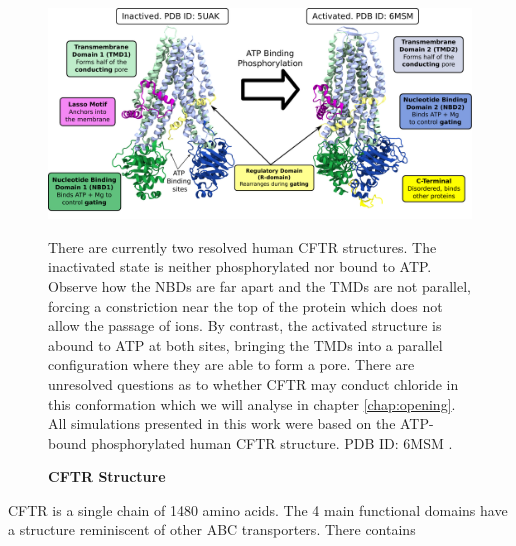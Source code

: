 \begin{figure}
	\begin{center}
	\includegraphics[width=\textwidth]{figures/CFTR_structure.pdf}
	\end{center}
	\label{CFTR_structure_domains}
	\captionsetup{singlelinecheck = false, justification=raggedright}
	\caption[CFTR Structure] {\textbf{CFTR Structure}}{There are currently two resolved human CFTR structures. The inactivated state is neither phosphorylated nor bound to ATP. Observe how the NBDs are far apart and the TMDs are not parallel, forcing a constriction near the top of the protein which does not allow the passage of ions. By contrast, the activated structure is abound to ATP at both sites, bringing the TMDs into a parallel configuration where they are able to form a pore. There are unresolved questions as to whether CFTR may conduct chloride in this conformation which we will analyse in chapter \ref{chap:opening}. All simulations presented in this work were based on the ATP-bound phosphorylated human CFTR structure. PDB ID: 6MSM \cite{zhang2018}.} 

\end{figure}
CFTR is a single chain of 1480 amino acids. The 4 main functional domains have a structure reminiscent of other ABC transporters. There  contains 

